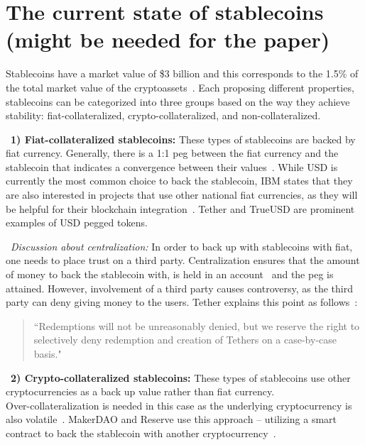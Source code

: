 \section{The current state of stablecoins (might be needed for the paper)}

Stablecoins have a market value of \$3 billion and this corresponds to the 1.5\% of the total market value of the cryptoassets~\cite{report}. Each proposing different properties, stablecoins can be categorized into three groups based on the way they achieve stability: fiat-collateralized, crypto-collateralized, and non-collateralized.

~\textbf{1) Fiat-collateralized stablecoins:} These types of stablecoins are backed by fiat currency. Generally, there is a 1:1 peg between the fiat currency and the stablecoin that indicates a convergence between their values~\cite{linkedin}. While USD is currently the most common choice to back the stablecoin, IBM states that they are also interested in projects that use other national fiat currencies, as they will be helpful for their blockchain integration~\cite{cointelegraph}. Tether and TrueUSD are prominent examples of USD pegged tokens.

~\textit{Discussion about centralization:} In order to back up with stablecoins with fiat, one needs to place trust on a third party. Centralization ensures that the amount of money to back the stablecoin with, is held in an account~\cite{techrev} and the peg is attained. However, involvement of a third party causes controversy, as the third party can deny giving money to the users. Tether explains this point as follows~\cite{cryptoinsider}:

\begin{quote}
``Redemptions will not be unreasonably denied, but we reserve the right to selectively deny redemption and creation of Tethers on a case-by-case basis."
\end{quote}


~\textbf{2) Crypto-collateralized stablecoins:} These types of stablecoins use other cryptocurrencies as a back up value rather than fiat currency. \\ Over-collateralization is needed in this case as the underlying cryptocurrency is also volatile~\cite{linkedin}. MakerDAO and Reserve use this approach -- utilizing a smart contract to back the stablecoin with another cryptocurrency~\cite{cointelegraph}.

